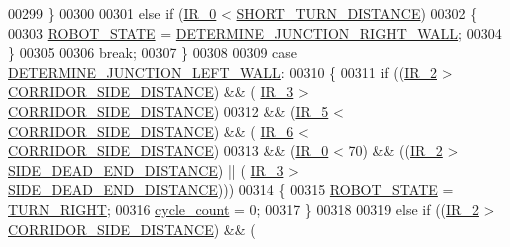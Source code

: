 \begin{DoxyCode}
00299             \}
00300             
00301             \textcolor{keywordflow}{else} \textcolor{keywordflow}{if} (\hyperlink{state__machine_8c_a7afcf874a71b2cde367dc9c28f5f01f1}{IR\_0} < \hyperlink{state__machine_8c_adf843098ef425aa129f5ff16d879f7f2}{SHORT\_TURN\_DISTANCE})
00302             \{
00303                 \hyperlink{state__machine_8h_a5e5321a4a9085b83c8161454bf7a145c}{ROBOT\_STATE} = \hyperlink{state__machine_8h_a94b1da2e055fff4d143aa6aa891f79a9a70c5928783e4499f7b546a5a33f836c7}{DETERMINE\_JUNCTION\_RIGHT\_WALL};
00304             \}
00305             
00306             \textcolor{keywordflow}{break};
00307         \}
00308         
00309         \textcolor{keywordflow}{case} \hyperlink{state__machine_8h_a94b1da2e055fff4d143aa6aa891f79a9a2497397fadf5bd52daeb9da4db429e77}{DETERMINE\_JUNCTION\_LEFT\_WALL}:
00310         \{
00311             \textcolor{keywordflow}{if} ((\hyperlink{state__machine_8c_a07cfb2e201909d017a88a2a86c32cd4b}{IR\_2} > \hyperlink{state__machine_8c_a201d56046ddf552d57b4862e0ec07a10}{CORRIDOR\_SIDE\_DISTANCE}) && (
      \hyperlink{state__machine_8c_a7831b71dc250258ecefe0e23f9920688}{IR\_3} > \hyperlink{state__machine_8c_a201d56046ddf552d57b4862e0ec07a10}{CORRIDOR\_SIDE\_DISTANCE})
00312             && (\hyperlink{state__machine_8c_ad00ba6cc1cf461bda7059f5aafc06142}{IR\_5} < \hyperlink{state__machine_8c_a201d56046ddf552d57b4862e0ec07a10}{CORRIDOR\_SIDE\_DISTANCE}) && (
      \hyperlink{state__machine_8c_a8c51bcd8b555e8c78fea79b88d28b55e}{IR\_6} < \hyperlink{state__machine_8c_a201d56046ddf552d57b4862e0ec07a10}{CORRIDOR\_SIDE\_DISTANCE})
00313             && (\hyperlink{state__machine_8c_a7afcf874a71b2cde367dc9c28f5f01f1}{IR\_0} < 70) && ((\hyperlink{state__machine_8c_a07cfb2e201909d017a88a2a86c32cd4b}{IR\_2} > \hyperlink{state__machine_8c_a31ba7e3e0116f665d5825f669052ed09}{SIDE\_DEAD\_END\_DISTANCE}) || (
      \hyperlink{state__machine_8c_a7831b71dc250258ecefe0e23f9920688}{IR\_3} > \hyperlink{state__machine_8c_a31ba7e3e0116f665d5825f669052ed09}{SIDE\_DEAD\_END\_DISTANCE})))
00314             \{
00315                 \hyperlink{state__machine_8h_a5e5321a4a9085b83c8161454bf7a145c}{ROBOT\_STATE} = \hyperlink{state__machine_8h_a94b1da2e055fff4d143aa6aa891f79a9a5867af0449808578577a55aad42450ed}{TURN\_RIGHT};
00316                 \hyperlink{state__machine_8c_a937f74a65988b9e22241ab3765b82c50}{cycle\_count} = 0;
00317             \}
00318             
00319             \textcolor{keywordflow}{else} \textcolor{keywordflow}{if} ((\hyperlink{state__machine_8c_a07cfb2e201909d017a88a2a86c32cd4b}{IR\_2} > \hyperlink{state__machine_8c_a201d56046ddf552d57b4862e0ec07a10}{CORRIDOR\_SIDE\_DISTANCE}) && (

\end{DoxyCode}
